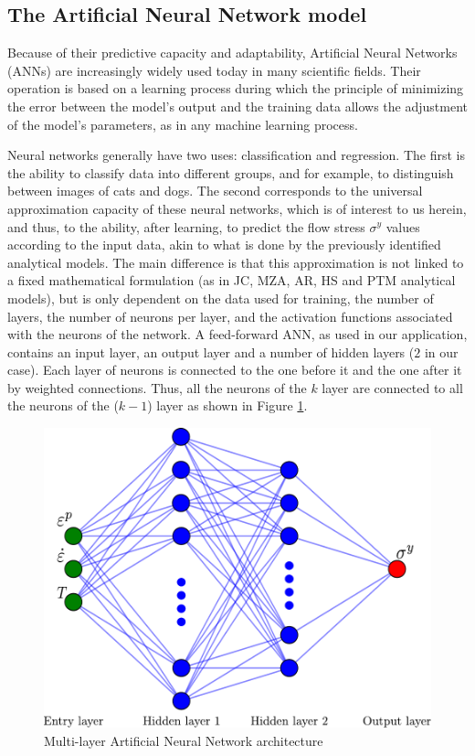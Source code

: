 \documentclass[twoside,english,1p,final,sort&compress]{elsarticle}
\theoremstyle{plain}
\begin{document}
\subsection{The Artificial Neural Network model\label{sec:ANNmodel}}

Because of their predictive capacity and adaptability, Artificial Neural Networks (ANNs) are increasingly widely used today in many scientific fields.
Their operation is based on a learning process during which the principle of minimizing the error between the model's output and the training data allows the adjustment of the model's parameters, as in any machine learning process.

Neural networks generally have two uses: classification and regression.
The first is the ability to classify data into different groups, and for example, to distinguish between images of cats and dogs.
The second corresponds to the universal approximation capacity of these neural networks, which is of interest to us herein, and thus, to the ability, after learning, to predict the flow stress $\sigma^y$ values according to the input data, akin to what is done by the previously identified analytical models.
The main difference is that this approximation is not linked to a fixed mathematical formulation (as in JC, MZA, AR, HS and PTM analytical models), but is only dependent on the data used for training, the number of layers, the number of neurons per layer, and the activation functions associated with the neurons of the network.
A feed-forward ANN, as used in our application, contains an input layer, an output layer and a number of hidden layers ($2$ in our case).
Each layer of neurons is connected to the one before it and the one after it by weighted connections.
Thus, all the neurons of the $k$ layer are connected to all the neurons of the ($k-1$) layer as shown in Figure \ref{fig:ANN-2HL}.
\begin{figure}[!ht]
\centering
\includegraphics[width=0.7\columnwidth]
{Figures/ANN-scheme-2HL}
\caption{Multi-layer Artificial Neural Network architecture}
\label{fig:ANN-2HL}
\end{figure}
\end{document}
